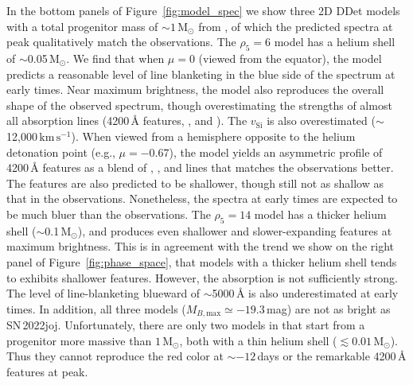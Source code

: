 \documentclass[twocolumn]{aastex631}
\newcommand{\sn}{SN\,2022joj}
\newcommand{\kms}{$\mathrm{km}\,\mathrm{s}^{-1}$}
\begin{document}
\begin{CJK*}{UTF8}{gbsn}

In the bottom panels of Figure~\ref{fig:model_spec} we show three 2D DDet models with a total progenitor mass of $\sim$$1\,\mathrm{M_\odot}$ from \citet{Shen_2D_2021}, of which the predicted spectra at peak qualitatively match the observations. The $\rho_5=6$ model has a helium shell of $\sim$0.05$\,\mathrm{M_\odot}$. We find that when $\mu=0$ (viewed from the equator), the model predicts a reasonable level of line blanketing in the blue side of the spectrum at early times. Near maximum brightness, the model also reproduces the overall shape of the observed spectrum, though overestimating the strengths of almost all absorption lines (4200\,\r{A} features, , and ). The $v_\mathrm{Si}$ is also overestimated ($\sim$12,000\,\kms). When viewed from a hemisphere opposite to the helium detonation point (e.g., $\mu=-0.67$), the model yields an asymmetric profile of 4200\,\r{A} features as a blend of , , and  lines that matches the observations better. The  features are also predicted to be shallower, though still not as shallow as that in the observations. Nonetheless, the spectra at early times are expected to be much bluer than the observations. The $\rho_5=14$ model has a thicker helium shell ($\sim$0.1\,$\mathrm{M_\odot}$), and produces even shallower and slower-expanding  features at maximum brightness. This is in agreement with the trend we show on the right panel of Figure~\ref{fig:phase_space}, that models with a thicker helium shell tends to exhibits shallower  features. However, the  absorption is not sufficiently strong. The level of line-blanketing blueward of $\sim$5000\,\r{A} is also underestimated at early times. In addition, all three models ($M_{B,\mathrm{max}}\simeq -19.3$\,mag) are not as bright as \sn. Unfortunately, there are only two models in \citet{Shen_2D_2021} that start from a progenitor more massive than $1\,\mathrm{M_\odot}$, both with a thin helium shell ($\lesssim$$0.01\,\mathrm{M_\odot}$). Thus they cannot reproduce the red color at $\sim$$-12$\,days or the remarkable 4200\,\r{A} features at peak.


\end{CJK*}
\end{document}
